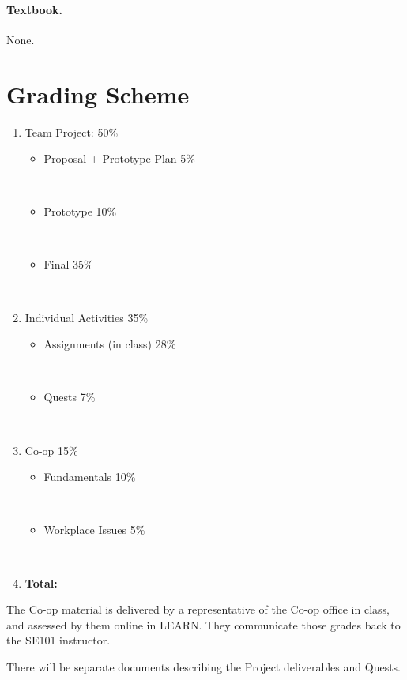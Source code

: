 \documentclass[11pt,onecolumn]{article}
\newcommand{\bi}{\begin{itemize}}
\newcommand{\ei}{\end{itemize}}
\newcommand{\be}{\begin{enumerate}}
\newcommand{\ee}{\end{enumerate}}
\newcommand{\biTight}{\vspace{-\parskip}\bi\setlength{\itemsep}{0pt}\setlength{\parskip}{0pt} }
\newcommand{\beTight}{\vspace{-\parskip}\be\setlength{\itemsep}{0pt}\setlength{\parskip}{0pt} }
\begin{document}
\paragraph{Textbook.} None.


\section{Grading Scheme}

\hspace*{0.25in}
\begin{minipage}{4in}
\beTight
    \item Team Project: \hspace{\fill} 50\%
        \biTight
        \item Proposal + Prototype Plan \hspace{\fill} 5\% \parbox{0.5in}{~}
        \item Prototype \hspace{\fill} 10\% \parbox{0.5in}{~}
        \item Final \hspace{\fill} 35\% \parbox{0.5in}{~}
        \ei
    \item Individual Activities \hspace{\fill} 35\%
        \biTight
        \item Assignments (in class) \hspace{\fill} 28\% \parbox{0.5in}{~}
        \item Quests \hspace{\fill} 7\% \parbox{0.5in}{~}
        \ei
    \item Co-op \hspace{\fill} 15\%
        \biTight
        \item Fundamentals \hspace{\fill} 10\% \parbox{0.5in}{~}
        \item Workplace Issues \hspace{\fill} 5\% \parbox{0.5in}{~}
        \ei
    \item \textbf{Total:} \hspace{\fill} 
\ee
\end{minipage}
\vspace{0.25in}

\noindent
The Co-op material is delivered by a representative of the Co-op
office in class, and assessed by them online in LEARN. They
communicate those grades back to the SE101 instructor.

\vspace*{1em} \noindent 
%
There will be separate documents describing the Project deliverables
and Quests.
\end{document}
